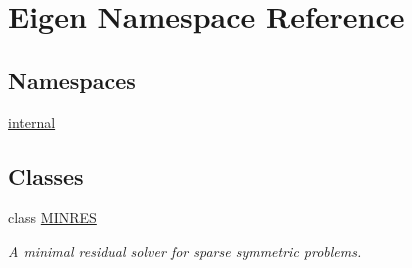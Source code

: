 \hypertarget{namespace_eigen}{}\section{Eigen Namespace Reference}
\label{namespace_eigen}
\subsection*{Namespaces}
\begin{DoxyCompactItemize}
\item 
 \hyperlink{namespace_eigen_1_1internal}{internal}
\end{DoxyCompactItemize}
\subsection*{Classes}
\begin{DoxyCompactItemize}
\item 
class \hyperlink{class_eigen_1_1_m_i_n_r_e_s}{M\+I\+N\+R\+E\+S}
\begin{DoxyCompactList}\small\item\em A minimal residual solver for sparse symmetric problems. \end{DoxyCompactList}\end{DoxyCompactItemize}
